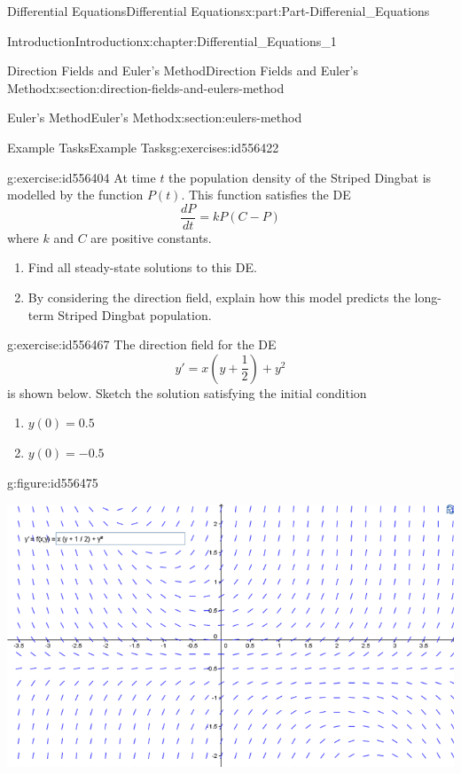 \documentclass[oneside,10pt,]{book}
\numberwithin{equation}{section}
\begin{document}
\begin{partptx}{Differential Equations}{}{Differential Equations}{}{}{x:part:Part-Differenial_Equations}
\begin{chapterptx}{Introduction}{}{Introduction}{}{}{x:chapter:Differential_Equations_1}
\begin{sectionptx}{Direction Fields and Euler's Method}{}{Direction Fields and Euler's Method}{}{}{x:section:direction-fields-and-eulers-method}
\begin{sectionptx}{Euler's Method}{}{Euler's Method}{}{}{x:section:eulers-method}
\begin{exercises-subsection-numberless}{Example Tasks}{}{Example Tasks}{}{}{g:exercises:id556422}
\begin{divisionexercise}{1}{}{}{g:exercise:id556404}%
At time \(t\) the population density of the Striped Dingbat is modelled by the function \(P(t)\). This function satisﬁes the DE%
\begin{equation*}
\frac{dP}{dt}=kP(C-P)
\end{equation*}
where \(k\) and \(C\) are positive constants.%
\par
%
\begin{enumerate}[label=\alph*.]
\item{}Find all steady-state solutions to this DE.%
\item{}By considering the direction ﬁeld, explain how this model predicts the long-term Striped Dingbat population.%
\end{enumerate}
%
\end{divisionexercise}%
\begin{divisionexercise}{2}{}{}{g:exercise:id556467}%
The direction field for the DE%
\begin{equation*}
y'=x\left(y+\frac{1}{2}\right)+y^2
\end{equation*}
is shown below. Sketch the solution satisfying the initial condition%
\par
%
\begin{enumerate}[label=\alph*.]
\item{}\(\displaystyle y(0)=0.5\)%
\item{}\(\displaystyle y(0)=-0.5\)%
\end{enumerate}
%
\begin{figureptx}{}{g:figure:id556475}{}%
\begin{image}{0.125}{0.75}{0.125}%
\includegraphics[width=\linewidth]{./DifferentialEquations/Images/1/2_ET2.png}
\end{image}%

\end{figureptx}
\end{divisionexercise}
\end{exercises-subsection-numberless}
\end{sectionptx}
\end{sectionptx}
\end{chapterptx}
\end{partptx}
\end{document}
